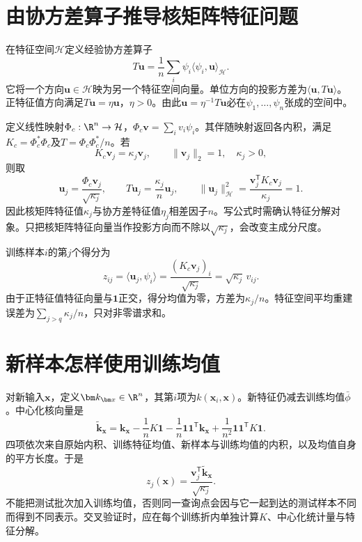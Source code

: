 \section{由协方差算子推导核矩阵特征问题}
在特征空间$\mathcal H$定义经验协方差算子
\begin{equation}
 T\bm u=\frac1n\sum_i\psi_i\langle\psi_i,\bm u\rangle_{\mathcal H}.
 \label{eq:kpca-covariance-operator}
\end{equation}
它将一个方向$\bm u\in\mathcal H$映为另一个特征空间向量。单位方向的投影方差为$\langle\bm u,T\bm u\rangle$。正特征值方向满足$T\bm u=\eta\bm u$，$\eta>0$。由此$\bm u=\eta^{-1}T\bm u$必在$\psi_1,\ldots,\psi_n$张成的空间中。

定义线性映射$\Phi_c:\R^n\to\mathcal H$，$\Phi_c\bm v=\sum_i v_i\psi_i$。其伴随映射返回各内积，满足$K_c=\Phi_c^*\Phi_c$及$T=\Phi_c\Phi_c^*/n$。若
\begin{equation}
 K_c\bm v_j=\kappa_j\bm v_j,\qquad
 \|\bm v_j\|_2=1,\quad\kappa_j>0,
\end{equation}
则取
\begin{equation}
 \bm u_j=\frac{\Phi_c\bm v_j}{\sqrt{\kappa_j}},\qquad
 T\bm u_j=\frac{\kappa_j}{n}\bm u_j,
 \qquad \|\bm u_j\|_{\mathcal H}^2
 =\frac{\bm v_j^{\mathsf T}K_c\bm v_j}{\kappa_j}=1.
 \label{eq:kpca-normalized-direction}
\end{equation}
因此核矩阵特征值$\kappa_j$与协方差特征值$\eta_j$相差因子$n$。写公式时需确认特征分解对象。只把核矩阵特征向量当作投影方向而不除以$\sqrt{\kappa_j}$，会改变主成分尺度。

训练样本$i$的第$j$个得分为
\begin{equation}
 z_{ij}=\langle\bm u_j,\psi_i\rangle
 =\frac{(K_c\bm v_j)_i}{\sqrt{\kappa_j}}
 =\sqrt{\kappa_j}\,v_{ij}.
 \label{eq:kpca-training-score}
\end{equation}
由于正特征值特征向量与$\bm1$正交，得分均值为零，方差为$\kappa_j/n$。特征空间平均重建误差为$\sum_{j>q}\kappa_j/n$，只对非零谱求和。

\section{新样本怎样使用训练均值}
对新输入$\bm x$，定义$\bm k_{\bm x}\in\R^n$，其第$i$项为$k(\bm x_i,\bm x)$。新特征仍减去训练均值$\bar\phi$。中心化核向量是
\begin{equation}
 \tilde{\bm k}_{\bm x}=\bm k_{\bm x}-\frac1nK\bm1
 -\frac1n\bm1\bm1^{\mathsf T}\bm k_{\bm x}
 +\frac1{n^2}\bm1\bm1^{\mathsf T}K\bm1.
 \label{eq:kpca-test-centering}
\end{equation}
四项依次来自原始内积、训练特征均值、新样本与训练均值的内积，以及均值自身的平方长度。于是
\begin{equation}
 z_j(\bm x)=\frac{\bm v_j^{\mathsf T}\tilde{\bm k}_{\bm x}}{\sqrt{\kappa_j}}.
 \label{eq:kpca-new-score}
\end{equation}
不能把测试批次加入训练均值，否则同一查询点会因与它一起到达的测试样本不同而得到不同表示。交叉验证时，应在每个训练折内单独计算$K$、中心化统计量与特征分解。

